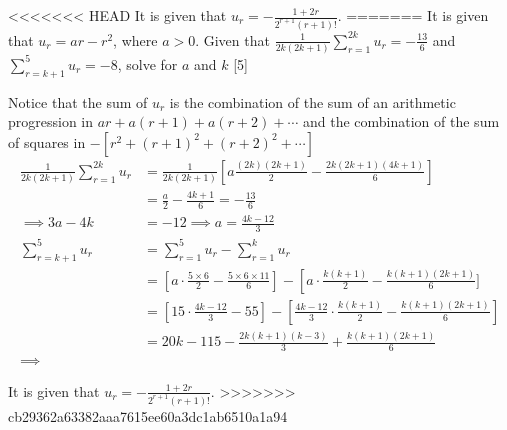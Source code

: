 \documentclass[12pt, a4 paper]{article}
\begin{document}
\begin{outline}[enumerate]
<<<<<<< HEAD
 \1 It is given that \(u_{r}=-\frac{1+2r}{2^{r+1}(r+1)!}\). %
=======
 \1 It is given that \(u_{r}=ar-r^2\), where \(a>0\). Given that \(\frac{1}{2k(2k+1)}\sum\limits_{r=1}^{2k}u_{r}=-\frac{13}{6}\) and \(\sum\limits_{r=k+1}^{5}u_{r}=-8\), solve for \(a\)  and \(k\) \hfill[5] %
\begin{answer}
  Notice that the sum of \(u_r\) is the combination of the sum of an arithmetic progression in \(ar + a(r+1) + a(r+2)+ \cdots \) and the combination of the sum of squares in \(-[r^2 + {(r+1)}^2 + {(r+2)}^2 + \cdots]\) \\
\begin{align*}
  \frac{1}{2k(2k+1)}\sum^{2k}_{r=1}u_r &= \frac{1}{2k(2k+1)}\left[a\frac{(2k)(2k+1)}{2} - \frac{2k(2k+1)(4k+1)}{6}\right] \\
  &= \frac{a}{2} - \frac{4k+1}{6} = -\frac{13}{6} \\
  \implies 3a-4k&=-12  \implies a = \frac{4k-12}{3} \\
  \sum^5_{r=k+1}u_r &= \sum^5_{r=1}u_r - \sum^k_{r=1}u_r \\
  &= \left[a\cdot\frac{5\times6}{2} - \frac{5\times6\times11}{6}\right] - \left[a\cdot\frac{k(k+1)}{2} - \frac{k(k+1)(2k+1)}{6}] \\
  &= \left[15\cdot\frac{4k-12}{3}-55\right] - \left[\frac{4k-12}{3}\cdot\frac{k(k+1)}{2} - \frac{k(k+1)(2k+1)}{6}\right] \\
  &= 20k-115-\frac{2k(k+1)(k-3)}{3}+\frac{k(k+1)(2k+1)}{6} \\
  \implies
\end{align*}
\end{answer}
 \1 It is given that \(u_{r}=-\frac{1+2r}{2^{r+1}(r+1)!}\). %
>>>>>>> cb29362a63382aaa7615ee60a3dc1ab6510a1a94


\end{outline}
\end{document}
